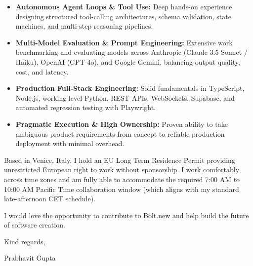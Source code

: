 \documentclass[11pt,a4paper]{article}
\begin{document}
\begin{itemize}[leftmargin=*]
    \item \textbf{Autonomous Agent Loops \& Tool Use:} Deep hands-on experience designing structured tool-calling architectures, schema validation, state machines, and multi-step reasoning pipelines.
    \item \textbf{Multi-Model Evaluation \& Prompt Engineering:} Extensive work benchmarking and evaluating models across Anthropic (Claude 3.5 Sonnet / Haiku), OpenAI (GPT-4o), and Google Gemini, balancing output quality, cost, and latency.
    \item \textbf{Production Full-Stack Engineering:} Solid fundamentals in TypeScript, Node.js, working-level Python, REST APIs, WebSockets, Supabase, and automated regression testing with Playwright.
    \item \textbf{Pragmatic Execution \& High Ownership:} Proven ability to take ambiguous product requirements from concept to reliable production deployment with minimal overhead.
\end{itemize}

\noindent Based in Venice, Italy, I hold an EU Long Term Residence Permit providing unrestricted European right to work without sponsorship. I work comfortably across time zones and am fully able to accommodate the required 7:00 AM to 10:00 AM Pacific Time collaboration window (which aligns with my standard late-afternoon CET schedule).

\noindent I would love the opportunity to contribute to Bolt.new and help build the future of software creation.

\vspace{8pt}

\noindent Kind regards,

\vspace{8pt}

\noindent Prabhavit Gupta
\end{document}
